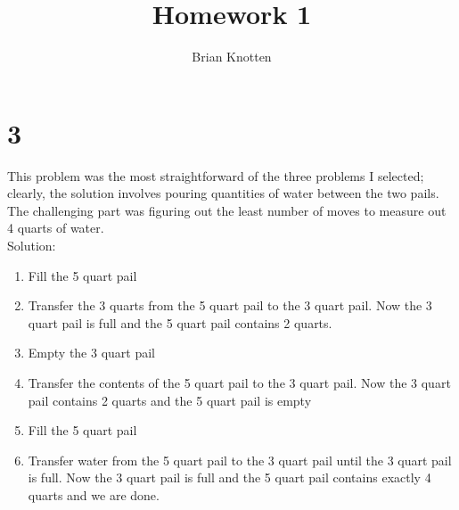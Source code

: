 \documentclass[letterpaper,notitlepage,twoside]{article}
\begin{document}
\title{Homework 1}
\author{Brian Knotten}
\maketitle

\section*{3}
This problem was the most straightforward of the three problems I selected; clearly, the solution involves pouring quantities of water between the two pails. The challenging part was figuring out the least number of moves to measure out 4 quarts of water. \\
Solution: \begin{enumerate}
\item Fill the 5 quart pail
\item Transfer the 3 quarts from the 5 quart pail to the 3 quart pail. Now the 3 quart pail is full and the 5 quart pail contains 2 quarts.
\item Empty the 3 quart pail
\item Transfer the contents of the 5 quart pail to the 3 quart pail. Now the 3 quart pail contains 2 quarts and the 5 quart pail is empty
\item Fill the 5 quart pail
\item Transfer water from the 5 quart pail to the 3 quart pail until the 3 quart pail is full. Now the 3 quart pail is full and the 5 quart pail contains exactly 4 quarts and we are done. 
\end{enumerate}
\end{document}

